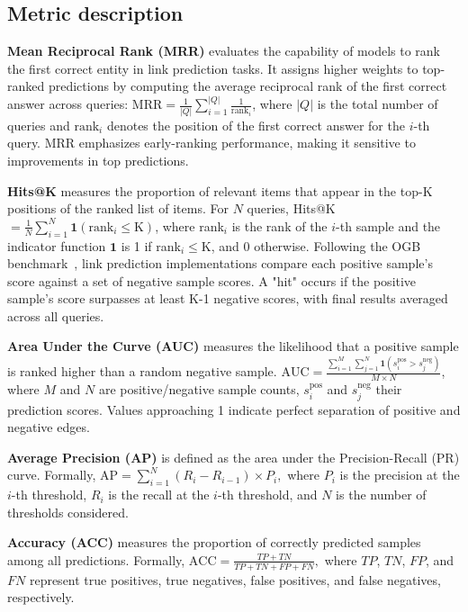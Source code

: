 \hypertarget{app_bench_metric}{}
\subsection{Metric description}\label{app_bench_metric}
\textbf{Mean Reciprocal Rank (MRR)} evaluates the capability of models to rank the first correct entity in link prediction tasks. It assigns higher weights to top-ranked predictions by computing the average reciprocal rank of the first correct answer across queries: $\text{MRR} = \frac{1}{|Q|} \sum_{i=1}^{|Q|} \frac{1}{\text{rank}_i}$, where \(|Q|\) is the total number of queries and \(\text{rank}_i\) denotes the position of the first correct answer for the \(i\)-th query. MRR emphasizes early-ranking performance, making it sensitive to improvements in top predictions.


\textbf{Hits@K} measures the proportion of relevant items that appear in the top-$\text{K}$ positions of the ranked list of items. For \(N\) queries, Hits@K$=\frac{1}{N}\sum\nolimits_{i=1}^{N}\mathbf{1}(\text{rank}_i\leq \text{K})$,
where rank$_i$ is the rank of the $i$-th sample and the indicator function $\mathbf{1}$ is 1 if rank$_i \leq \text{K}$, and 0 otherwise. Following the OGB benchmark~\cite{ogb}, link prediction implementations compare each positive sample's score against a set of negative sample scores. A "hit" occurs if the positive sample's score surpasses at least K-1 negative scores, with final results averaged across all queries.


\textbf{Area Under the Curve (AUC)} measures the likelihood that a positive sample is ranked higher than a random negative sample. \(\text{AUC} = \frac{\sum_{i=1}^{M}\sum_{j=1}^{N}\mathbf{1}(s_i^{\text{pos}} > s_j^{\text{neg}})}{M \times N}\), where \(M\) and \(N\) are positive/negative sample counts, \(s_i^{\text{pos}}\) and \(s_j^{\text{neg}}\) their prediction scores. Values approaching 1 indicate perfect separation of positive and negative edges.

\textbf{Average Precision (AP)} is defined as the area under the Precision-Recall (PR) curve. Formally, \(\text{AP} = \sum_{i=1}^{N} (R_i - R_{i-1}) \times P_i,\) where \(P_i\) is the precision at the \(i\)-th threshold, \(R_i\) is the recall at the \(i\)-th threshold, and \(N\) is the number of thresholds considered. 

\textbf{Accuracy (ACC)} measures the proportion of correctly predicted samples among all predictions. Formally, \(\text{ACC} = \frac{TP + TN}{TP + TN + FP + FN},\) where \(TP\), \(TN\), \(FP\), and \(FN\) represent true positives, true negatives, false positives, and false negatives, respectively.

